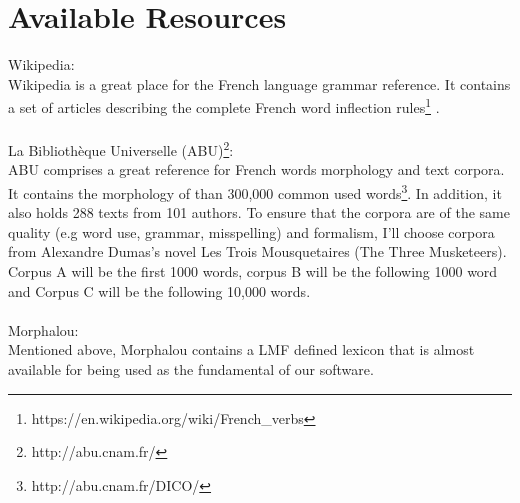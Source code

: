 \documentclass[11pt,letterpaper]{article}
\begin{document}
\section{Available Resources}

Wikipedia:\\
\indent Wikipedia is a great place for the French language grammar reference. It contains a set of articles describing the complete French word inflection rules\footnote{https://en.wikipedia.org/wiki/French\_verbs} .\\
\\
La Bibliothèque Universelle (ABU)\footnote{http://abu.cnam.fr/}:\\
\indent ABU comprises a great reference for French words morphology and text corpora. It contains the morphology of than 300,000 common used words\footnote{http://abu.cnam.fr/DICO/}. In addition, it also holds 288 texts from 101 authors. To ensure that the corpora are of the same quality (e.g word use, grammar, misspelling) and formalism, I'll choose corpora from Alexandre Dumas's novel Les Trois Mousquetaires (The Three Musketeers). Corpus A will be the first 1000 words, corpus B will be the following 1000 word and Corpus C will be the following 10,000 words.\\
\\
Morphalou:\\
\indent Mentioned above, Morphalou contains a LMF defined lexicon that is almost available for being used as the fundamental of our software.\\
\end{document}
